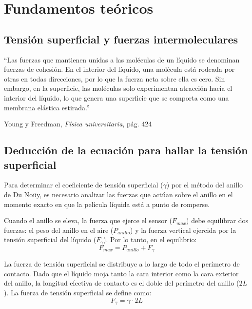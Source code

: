 \documentclass[11pt,a4paper]{article}
\begin{document}
\newpage
\section{Fundamentos teóricos}

\subsection{Tensión superficial y fuerzas intermoleculares}

``Las fuerzas que mantienen unidas a las moléculas de un líquido se denominan fuerzas de cohesión. En el interior del líquido, una molécula está rodeada por otras en todas direcciones, por lo que la fuerza neta sobre ella es cero. Sin embargo, en la superficie, las moléculas solo experimentan atracción hacia el interior del líquido, lo que genera una superficie que se comporta como una membrana elástica estirada.''

\begin{flushright}
Young y Freedman, \textit{Física universitaria}, pág. 424
\end{flushright}

\subsection{Deducción de la ecuación para hallar la tensión superficial}

Para determinar el coeficiente de tensión superficial (\(\gamma\)) por el  método del anillo de Du Noüy, es necesario analizar las fuerzas que actúan sobre el anillo en el momento exacto en que la película líquida está a punto de romperse.

Cuando el anillo se eleva, la fuerza que ejerce el sensor (\(F_{max}\)) debe equilibrar dos fuerzas: el peso del anillo en el aire (\(P_{anillo}\)) y la fuerza vertical ejercida por la tensión superficial del líquido (\(F_\gamma\)). Por lo tanto, en el equilibrio:
\begin{equation*}
    F_{max} = P_{anillo} + F_\gamma
\end{equation*}

La fuerza de tensión superficial se distribuye a lo largo de todo el perímetro de contacto. Dado que el líquido moja tanto la cara interior como la cara exterior del anillo, la longitud efectiva de contacto es el doble del perímetro del anillo (\(2L\)). La fuerza de tensión superficial se define como:
\begin{equation*}
    F_\gamma = \gamma \cdot 2L
\end{equation*}
\end{document}
